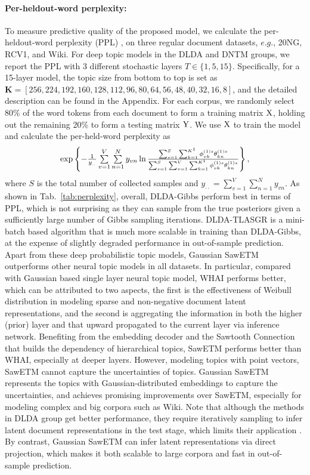 \documentclass{article}
\begin{document}
\paragraph{Per-heldout-word perplexity:} To measure predictive quality of the proposed model, we calculate the per-heldout-word perplexity (PPL)  \cite{cong2017deep}, on three regular document datasets, $e.g.$, 20NG, RCV1, and Wiki. For deep topic models in the DLDA and DNTM groups, we report the PPL with 3 different stochastic layers $T \in \{1, 5, 15\}$. Specifically, for a 15-layer model, the topic size from bottom to top is set as $\mathbf{K} = [256, 224, 192, 160, 128, 112, 96, 80, 64, 56, 48, 40, 32, 16, 8]$, and the detailed description can be found in the Appendix. For each corpus, we randomly select 80\% of the word tokens from each document to form a training matrix ${\rm{X}}$, holding out the remaining 20\% to form a testing matrix ${\rm{Y}}$. We use ${\rm{X}}$ to train the model and calculate the per-held-word perplexity as
 $$\textstyle \exp \left\{ { - {1 \over {{y_{..}}}}\sum\limits_{v = 1}^V {\sum\limits_{n = 1}^N {{y_{vn}}\ln {{\sum\nolimits_{s = 1}^S {\sum\nolimits_{k = 1}^{{K^1}} {\phi _{vk}^{\left( 1 \right)s}\theta _{kn}^{\left( 1 \right)s}} } } \over {\sum\nolimits_{s = 1}^S {\sum\nolimits_{v = 1}^V {\sum\nolimits_{k = 1}^{{K^1}} {\phi _{vk}^{\left( 1 \right)s}\theta _{kn}^{\left( 1 \right)s}} } } }}} } } \right\},$$ where $S$ is the total number of collected samples and ${y_{ \cdot  \cdot }} = \sum\nolimits_{v = 1}^V {\sum\nolimits_{n = 1}^N {{y_{vn}}} }$.
 As shown in Tab.~\ref{tab:perplexity}, overall, DLDA-Gibbs perform best in terms of PPL, which is not surprising as they can sample from the true posteriors given a sufficiently large number of Gibbs sampling iterations. DLDA-TLASGR is a mini-batch based algorithm that is much more scalable in training than DLDA-Gibbs, at the expense of slightly degraded performance in out-of-sample prediction. Apart from these deep probabilistic topic models, Gaussian SawETM outperforms other neural topic models in all datasets. In particular, compared with Gaussian based single layer neural topic model, WHAI performs better, which can be attributed to two aspects, the first is the effectiveness of Weibull distribution in modeling sparse and non-negative document latent representations, and the second is aggregating the information in both the higher (prior) layer and that upward propagated to the current layer via inference network. Benefiting from the embedding decoder and the Sawtooth Connection that builds the dependency of hierarchical topics, SawETM performs better than WHAI, especially at deeper layers. However, modeling topics with point vectors, SawETM cannot capture the uncertainties of topics. Gaussian SawETM represents the topics with Gaussian-distributed embeddings to capture the uncertainties, and achieves promising improvements over SawETM, especially for modeling complex and big corpora such as Wiki. Note that although the methods in DLDA group get better performance, they require iteratively sampling to infer latent document representations in the test stage, which limits their application \cite{zhang2018whai}. By contrast, Gaussian SawETM can infer latent representations via direct projection, which makes it both scalable to large corpora and fast in out-of-sample prediction.
\end{document}
